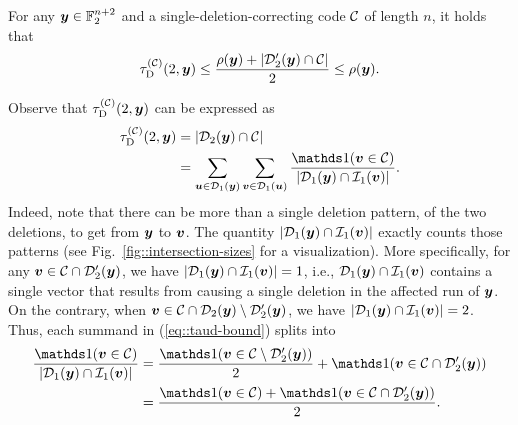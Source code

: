 \documentclass[conference, a4paper]{IEEEtran}
\begin{document}
\begin{lemma}
    For any ${\boldsymbol y} \in \mathbb{F}_2^{n+2}$ and a single-deletion-correcting code $\mathcal{C}$ of length $n$, it holds that 
    \begin{equation*}
        \tau_{\mathrm{D}}^{(\mathcal{C})}(2,{\boldsymbol y})\leq \frac{\rho({\boldsymbol y})+ |\mathcal{D}'_{2}({\boldsymbol y}) \cap \mathcal{C}|}{2} \leq \rho({\boldsymbol y}).\end{equation*}\label{lem::taud_upper_bound}
\end{lemma}
\begin{IEEEproof}
    Observe that $\tau_{\mathrm{D}}^{(\mathcal{C})}(2,{\boldsymbol y})$ can be expressed as
    \begin{align}
        \tauD^{(\cC)}(2,\bfy) &= |\balldel{\bfy}{2} \cap \cC| \nonumber \\
        &= \sum_{\bfu \in \balldel{\bfy}{1}} \sum_{\bfv \in \balldel{\bfu}{1}} \frac{\indicator(\bfv \in \cC)}{|\balldel{\bfy}{1} \cap \ballins{\bfv}{1}|}. \label{eq::taud-bound}
    \end{align}
    Indeed, note that there can be more than a single deletion pattern, of the two deletions, to get from ${\boldsymbol y}$ to ${\boldsymbol v}$. 
    The quantity $|\mathcal{D}_{1}({\boldsymbol y}) \cap \mathcal{I}_{1}({\boldsymbol v})|$ exactly counts those patterns (see Fig.~\ref{fig::intersection-sizes} for a visualization).
    More specifically, for any ${\boldsymbol v} \in \mathcal{C} \cap \mathcal{D}'_{2}({\boldsymbol y})$, we have $|\mathcal{D}_{1}({\boldsymbol y}) \cap \mathcal{I}_{1}({\boldsymbol v})| = 1$, i.e., $\mathcal{D}_{1}({\boldsymbol y}) \cap \mathcal{I}_{1}({\boldsymbol v})$ contains a single vector that results from causing a single deletion in the affected run of ${\boldsymbol y}$. On the contrary, when ${\boldsymbol v} \in \mathcal{C} \cap \mathcal{D}_{2}({\boldsymbol y}) \setminus \mathcal{D}'_{2}({\boldsymbol y})$, we have $|\mathcal{D}_{1}({\boldsymbol y}) \cap \mathcal{I}_{1}({\boldsymbol v})| = 2$. Thus, each summand in (\ref{eq::taud-bound}) splits into
    \begin{align*}
        \frac{\indicator(\bfv \in \cC)}{|\balldel{\bfy}{1} \cap \ballins{\bfv}{1}|} &= \frac{\indicator(\bfv \in \cC \setminus \balldelp{\bfy}{2})}{2} + \indicator(\bfv \in \cC \cap \balldelp{\bfy}{2}) \\
        &= \frac{\indicator(\bfv \in \cC)+\indicator(\bfv \in \cC \cap \balldelp{\bfy}{2})}{2}.
    \end{align*}   
    

\end{IEEEproof}
\end{document}
